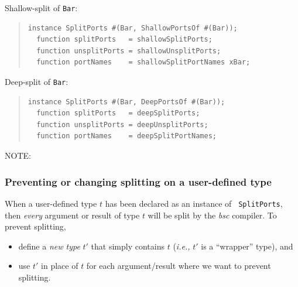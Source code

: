Shallow-split of {\tt Bar}:
\begin{quote}
\begin{verbatim}
instance SplitPorts #(Bar, ShallowPortsOf #(Bar));
  function splitPorts   = shallowSplitPorts;
  function unsplitPorts = shallowUnsplitPorts;
  function portNames    = shallowSplitPortNames xBar;
\end{verbatim}
\end{quote}

Deep-split of {\tt Bar}:
\begin{quote}
\begin{verbatim}
instance SplitPorts #(Bar, DeepPortsOf #(Bar));
  function splitPorts   = deepSplitPorts;
  function unsplitPorts = deepUnsplitPorts;
  function portNames    = deepSplitPortNames;
\end{verbatim}
\end{quote}

NOTE: \hfill {}


\subsubsection{Preventing or changing splitting on a user-defined type}

\label{sec:splitports_overriding_SplitPorts}


When a user-defined type $t$ has been declared as an instance of {\tt
  SplitPorts}, then \emph{every} argument or result of type $t$ will
be split by the \emph{bsc} compiler.  To prevent splitting,
\begin{itemize}

  \item define a \emph{new type} $t'$ that simply contains $t$ (\emph{i.e.,}
    $t'$ is a ``wrapper'' type), and

  \item use $t'$ in place of $t$ for each argument/result where we
    want to prevent splitting.

\end{itemize}

